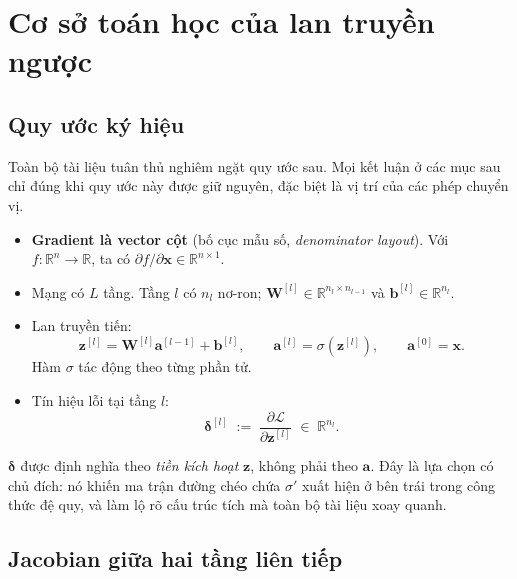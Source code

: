 \section{Cơ sở toán học của lan truyền ngược}
\label{sec:cosotoan}

\subsection{Quy ước ký hiệu}
\label{subsec:kyhieu}

Toàn bộ tài liệu tuân thủ nghiêm ngặt quy ước sau. Mọi kết luận ở các mục sau chỉ
đúng khi quy ước này được giữ nguyên, đặc biệt là vị trí của các phép chuyển vị.

\begin{itemize}[leftmargin=*, itemsep=2pt]
  \item \textbf{Gradient là vector cột} (bố cục mẫu số, \emph{denominator
    layout}). Với $f:\mathbb{R}^n\to\mathbb{R}$, ta có
    $\partial f/\partial \mathbf{x}\in\mathbb{R}^{n\times 1}$.
  \item Mạng có $L$ tầng. Tầng $l$ có $n_l$ nơ-ron;
    $\mathbf{W}^{[l]}\in\mathbb{R}^{n_l\times n_{l-1}}$ và
    $\mathbf{b}^{[l]}\in\mathbb{R}^{n_l}$.
  \item Lan truyền tiến:
    \begin{equation}
      \mathbf{z}^{[l]} = \mathbf{W}^{[l]}\mathbf{a}^{[l-1]} + \mathbf{b}^{[l]},
      \qquad
      \mathbf{a}^{[l]} = \sigma\!\left(\mathbf{z}^{[l]}\right),
      \qquad
      \mathbf{a}^{[0]} = \mathbf{x}.
      \label{eq:forward}
    \end{equation}
    Hàm $\sigma$ tác động theo từng phần tử.
  \item Tín hiệu lỗi tại tầng $l$:
    \begin{equation}
      \boldsymbol{\delta}^{[l]}
      \;:=\; \frac{\partial\mathcal{L}}{\partial\mathbf{z}^{[l]}}
      \;\in\;\mathbb{R}^{n_l}.
      \label{eq:deltadef}
    \end{equation}
\end{itemize}

\begin{notebox}
$\boldsymbol{\delta}$ được định nghĩa theo \emph{tiền kích hoạt} $\mathbf{z}$,
không phải theo $\mathbf{a}$. Đây là lựa chọn có chủ đích: nó khiến ma trận đường
chéo chứa $\sigma'$ xuất hiện ở bên trái trong công thức đệ quy, và làm lộ rõ cấu
trúc tích mà toàn bộ tài liệu xoay quanh.
\end{notebox}

\subsection{Jacobian giữa hai tầng liên tiếp}


